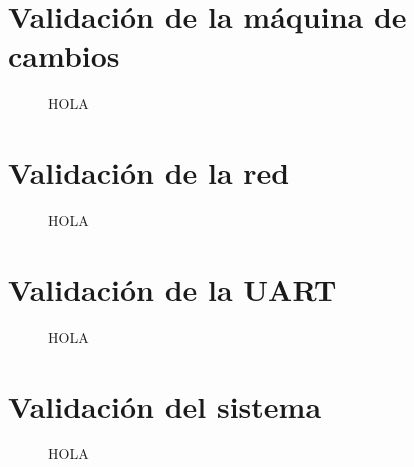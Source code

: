 \section{Validación de la máquina de cambios}

	\begin{figure}[h]
	\centering
		\caption{HOLA}
		\label{fig:hola}
	\end{figure}
	
\section{Validación de la red}

	\begin{figure}[h]
	\centering
		\caption{HOLA}
		\label{fig:hola}
	\end{figure}
	
\section{Validación de la UART}

	\begin{figure}[h]
	\centering
		\caption{HOLA}
		\label{fig:hola}
	\end{figure}
	
\section{Validación del sistema}

	\begin{figure}[h]
	\centering
		\caption{HOLA}
		\label{fig:hola}
	\end{figure}
